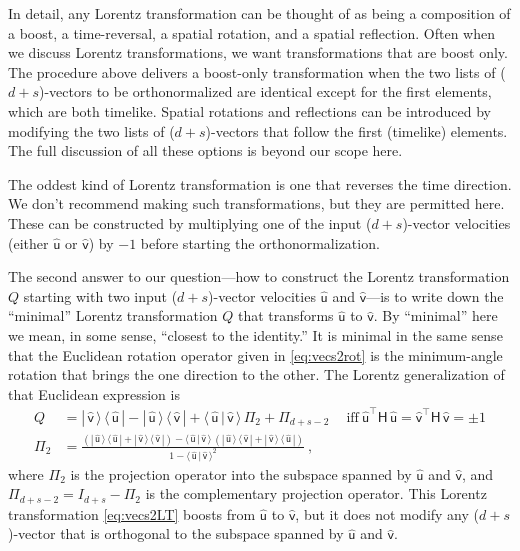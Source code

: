 \documentclass{article}
\newcommand{\metric}{\mathsf{H}}
\newcommand{\proj}{\mathsf{\Pi}}
\newcommand{\Lhat}[1]{\hat{\mathsf{#1}}} %
\newcommand{\braket}[2]{\langle\,{#1}\,|\,{#2}\,\rangle}
\newcommand{\ketbra}[2]{|\,{#1}\,\rangle\,\langle\,{#2}\,|}
\newcommand{\plus}{\!+\!} %
\begin{document}
In detail, any Lorentz transformation can be thought of as being a composition of a boost, a time-reversal, a spatial rotation, and a spatial reflection.
Often when we discuss Lorentz transformations, we want transformations that are boost only.
The procedure above delivers a boost-only transformation when the two lists of ($d\plus s$)-vectors to be orthonormalized are identical except for the first elements, which are both timelike.
Spatial rotations and reflections can be introduced by modifying the two lists of ($d\plus s$)-vectors that follow the first (timelike) elements.
The full discussion of all these options is beyond our scope here.

The oddest kind of Lorentz transformation is one that reverses the time direction.
We don't recommend making such transformations, but they are permitted here.
These can be constructed by multiplying one of the input ($d\plus s$)-vector velocities (either $\Lhat{u}$ or $\Lhat{v}$) by $-1$ before starting the orthonormalization.

The second answer to our question---how to construct the Lorentz transformation $Q$ starting with two input ($d\plus s$)-vector velocities $\Lhat{u}$ and $\Lhat{v}$---is to write down the ``minimal'' Lorentz transformation $Q$ that transforms $\Lhat{u}$ to $\Lhat{v}$.
By ``minimal'' here we mean, in some sense, ``closest to the identity.''
It is minimal in the same sense that the Euclidean rotation operator given in \eqref{eq:vecs2rot} is the minimum-angle rotation that brings the one direction to the other.
The Lorentz generalization of that Euclidean expression is
\begin{align}
    Q &= \ketbra{\Lhat{v}}{\Lhat{u}} - \ketbra{\Lhat{u}}{\Lhat{v}} + \braket{\Lhat{u}}{\Lhat{v}}\,\proj_{2} + \proj_{d+s-2} \quad~ \mbox{iff} ~ \Lhat{u}^\top\metric\,\Lhat{u} = \Lhat{v}^\top\metric\,\Lhat{v} = \pm 1 \label{eq:vecs2LT} \\
    \proj_{2} &= \frac{\left(\ketbra{\Lhat{u}}{\Lhat{u}} + \ketbra{\Lhat{v}}{\Lhat{v}}\right) - \braket{\Lhat{u}}{\Lhat{v}}\,\left(\ketbra{\Lhat{u}}{\Lhat{v}} + \ketbra{\Lhat{v}}{\Lhat{u}}\right)}{1 - \braket{\Lhat{u}}{\Lhat{v}}^2} ~,
\end{align}
where $\proj_{2}$ is the projection operator into the subspace spanned by $\Lhat{u}$ and $\Lhat{v}$,
and $\proj_{d+s-2} = I_{d+s} - \proj_{2}$ is the complementary projection operator.
This Lorentz transformation \eqref{eq:vecs2LT} boosts from $\Lhat{u}$ to $\Lhat{v}$, but it does not modify any ($d\plus s$)-vector that is orthogonal to the subspace spanned by $\Lhat{u}$ and $\Lhat{v}$.
\end{document}
